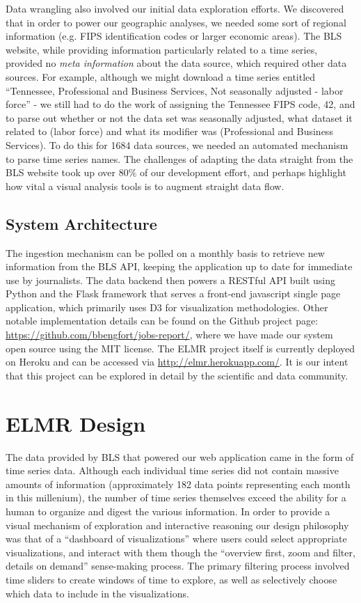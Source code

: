 \documentclass{sigchi}
\begin{document}
Data wrangling also involved our initial data exploration efforts. We discovered that in order to power our geographic analyses, we needed some sort of regional information (e.g. FIPS identification codes or larger economic areas). The BLS website, while providing information particularly related to a time series, provided no \textit{meta information} about the data source, which required other data sources. For example, although we might download a time series entitled ``Tennessee, Professional and Business Services, Not seasonally adjusted - labor force'' - we still had to do the work of assigning the Tennessee FIPS code, 42, and to parse out whether or not the data set was seasonally adjusted, what dataset it related to (labor force) and what its modifier was (Professional and Business Services). To do this for 1684 data sources, we needed an automated mechanism to parse time series names. The challenges of adapting the data straight from the BLS website took up over 80\% of our development effort, and perhaps highlight how vital a visual analysis tools is to augment straight data flow.

\subsection{System Architecture}

The ingestion mechanism can be polled on a monthly basis to retrieve new information from the BLS API, keeping the application up to date for immediate use by journalists. The data backend then powers a RESTful API built using Python and the Flask framework that serves a front-end javascript single page application, which primarily uses D3 for visualization methodologies. Other notable implementation details can be found on the Github project page: \url{https://github.com/bbengfort/jobs-report/}, where we have made our system open source using the MIT license. The ELMR project itself is currently deployed on Heroku and can be accessed via \url{http://elmr.herokuapp.com/}. It is our intent that this project can be explored in detail by the scientific and data community.

\section{ELMR Design}

The data provided by BLS that powered our web application came in the form of time series data. Although each individual time series did not contain massive amounts of information (approximately 182 data points representing each month in this millenium), the number of time series themselves exceed the ability for a human to organize and digest the various information. In order to provide a visual mechanism of exploration and interactive reasoning our design philosophy was that of a ``dashboard of visualizations'' where users could select appropriate visualizations, and interact with them though the ``overview first, zoom and filter, details on demand'' sense-making process. The primary filtering process involved time sliders to create windows of time to explore, as well as selectively choose which data to include in the visualizations.
\end{document}
